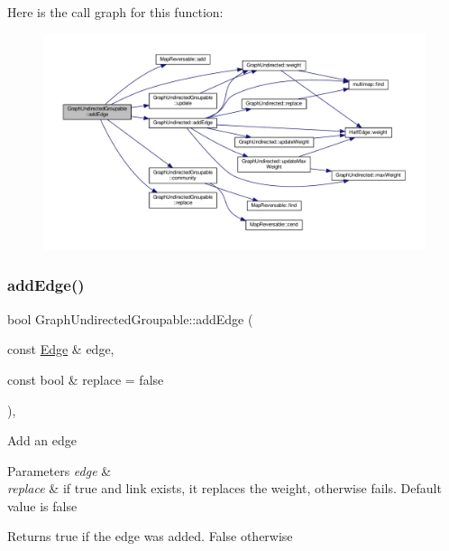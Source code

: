 Here is the call graph for this function\+:\nopagebreak
\begin{figure}[H]
\begin{center}
\leavevmode
\includegraphics[width=350pt]{classGraphUndirectedGroupable_a8c010517bff903a50807e6e8ad8cc6db_cgraph}
\end{center}
\end{figure}
\mbox{\label{classGraphUndirectedGroupable_a2efe963916349ac6615721ab85a93ceb}} 
\subsubsection{\texorpdfstring{add\+Edge()}{addEdge()}\hspace{0.1cm}{\footnotesize\ttfamily [2/2]}}
{\footnotesize\ttfamily bool Graph\+Undirected\+Groupable\+::add\+Edge (\begin{DoxyParamCaption}\item[{const \hyperlink{classEdge}{Edge} \&}]{edge,  }\item[{const bool \&}]{replace = {\ttfamily false} }\end{DoxyParamCaption})\hspace{0.3cm}{\ttfamily [inline]}, {\ttfamily [virtual]}}

Add an edge


\begin{DoxyParams}{Parameters}
{\em edge} & \\
\hline
{\em replace} & if true and link exists, it replaces the weight, otherwise fails. Default value is false \\
\hline
\end{DoxyParams}
\begin{DoxyReturn}{Returns}
true if the edge was added. False otherwise 
\end{DoxyReturn}


